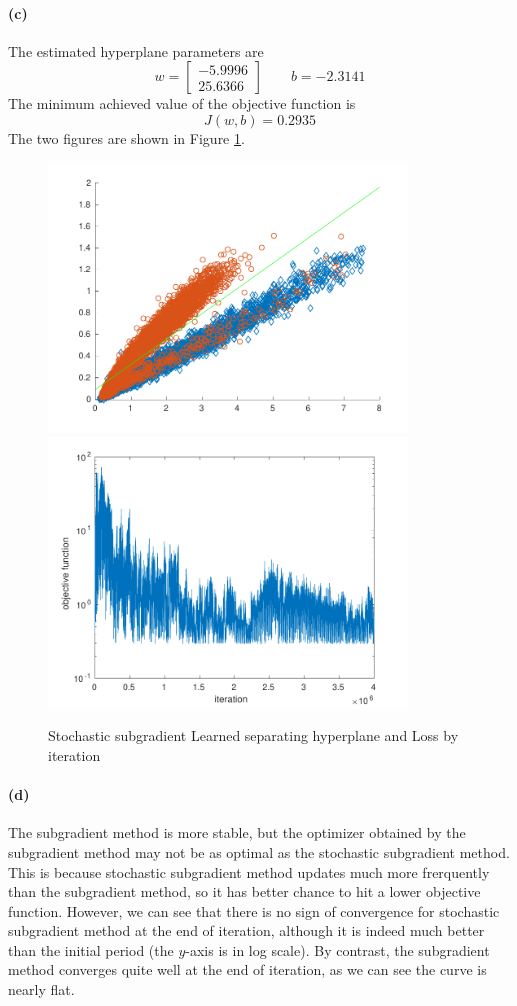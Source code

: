 \documentclass[12pt]{article}
\begin{document}
\paragraph{(c)}
The estimated hyperplane parameters are
\[ w=\begin{bmatrix} -5.9996 \\ 25.6366 \end{bmatrix} \hspace{2em} b=-2.3141 \]
The minimum achieved value of the objective function is
\[ J(w,b)=0.2935 \]
The two figures are shown in Figure \ref{hw3p4c}.
\begin{figure}[htbp]
    \centering
    \includegraphics[width=0.85\textwidth]{./hw3/problem4/hw3p4c1.pdf}
    \includegraphics[width=0.85\textwidth]{./hw3/problem4/hw3p4c2.pdf}
    \caption{Stochastic subgradient Learned separating hyperplane and Loss by iteration}
    \label{hw3p4c}
\end{figure}
\paragraph{(d)}
The subgradient method is more stable, but the optimizer obtained by the subgradient method may not be as optimal as the stochastic subgradient method.
This is because stochastic subgradient method updates much more frerquently than the subgradient method, so it has better chance to hit a lower objective function.
However, we can see that there is no sign of convergence for stochastic subgradient method at the end of iteration, although it is indeed much better than the initial period (the \(y\)-axis is in log scale).
By contrast, the subgradient method converges quite well at the end of iteration, as we can see the curve is nearly flat.
\end{document}
